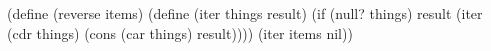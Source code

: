 \begtt\scm
(define (reverse items)
  (define (iter things result)
    (if (null? things)
        result
        (iter (cdr things)
              (cons (car things) result))))
  (iter items nil))
\endtt
